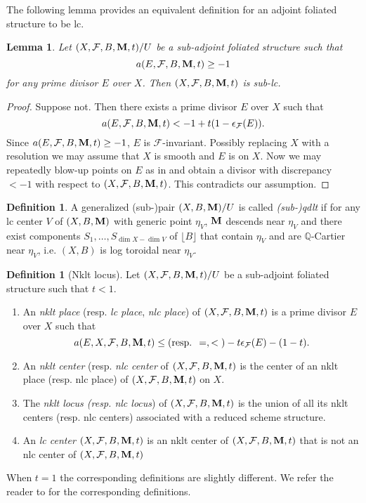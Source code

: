 \documentclass[12pt]{amsart}
\newcommand{\calum}[1]{{\textcolor{blue}{[Calum: #1]}}}
\numberwithin{equation}{section}
\newcommand{\Mm}{{\bf{M}}}
\newcommand{\Qq}{\mathbb{Q}}
\newcommand{\Ff}{\mathcal{F}}
\newtheorem{lem}[thm]{Lemma}
\theoremstyle{definition}
\newtheorem{defn}[thm]{Definition}
\theoremstyle{definition}
\theoremstyle{definition}
\begin{document}
The following lemma provides an equivalent definition for an adjoint foliated structure to be lc.

\begin{lem}
 Let $(X,\Ff,B,\Mm,t)/U$ be a sub-adjoint foliated structure
 such that 
 $$a(E,\Ff,B,\Mm,t)\geq -1$$
  for any prime divisor $E$ over $X$. Then $(X,\Ff,B,\Mm,t)$ is sub-lc.
\end{lem}
\begin{proof}
    Suppose not. Then there exists a prime divisor $E$ over $X$ such that 
     $$a(E,\Ff,B,\Mm,t)<-1+t(1-\epsilon_{\Ff}(E)).$$
Since $a(E,\Ff,B,\Mm,t)\geq -1$, $E$ is $\Ff$-invariant.
Possibly replacing $X$ with a resolution we may assume that $X$ is smooth and $E$ is on $X$. Now we may repeatedly blow-up points on $E$ as in \cite[Remark 2.3]{CS21} and obtain a divisor with discrepancy $<-1$ with respect to $(X,\Ff,B,\Mm,t)$. This contradicts our assumption.
\end{proof}

\begin{defn}
    A generalized (sub-)pair $(X,B,\Mm)/U$ is called \emph{(sub-)qdlt} if for any lc center $V$ of $(X,B,\Mm)$ with generic point $\eta_V$, $\Mm$ descends near $\eta_V$ and there exist components $S_1,\dots,S_{\dim X-\dim V}$ of $\lfloor B\rfloor$ that contain $\eta_V$ and are $\Qq$-Cartier near $\eta_V$, i.e. $(X,B)$ is log toroidal near $\eta_V$.
\end{defn}


\begin{defn}[Nklt locus]\label{defn: nklt locus}
    Let $(X,\Ff,B,\Mm,t)/U$ be a sub-adjoint foliated structure such that $t<1$. 
    \begin{enumerate}
        \item  An \emph{nklt place} (resp. \emph{lc place}, \emph{nlc place}) of $(X,\Ff,B,\Mm,t)$ is a prime divisor $E$ over $X$ such that 
        $$a(E,X,\Ff,B,\Mm,t)\leq\text{(resp. }=, <\text{)} -t\epsilon_{\Ff}(E)-(1-t).$$
        \item   An \emph{nklt center} (resp. \emph{nlc center} of $(X,\Ff,B,\Mm,t)$ is the center of an nklt place (resp. nlc place) of $(X,\Ff,B,\Mm,t)$ on $X$.
        \item The \emph{nklt locus (resp. \emph{nlc locus}}) of $(X,\Ff,B,\Mm,t)$ is the union of all its nklt centers (resp. nlc centers) associated with a reduced scheme structure.
        \item  An \emph{lc center} $(X,\Ff,B,\Mm,t)$ is an nklt center of $(X,\Ff,B,\Mm,t)$ that is not an nlc center of $(X,\Ff,B,\Mm,t)$ 
    \end{enumerate}
    When $t=1$ the corresponding definitions are slightly different. We refer the reader to \cite[Definition 3.4.5]{CHLX23} for the corresponding definitions.
\end{defn}
\end{document}
